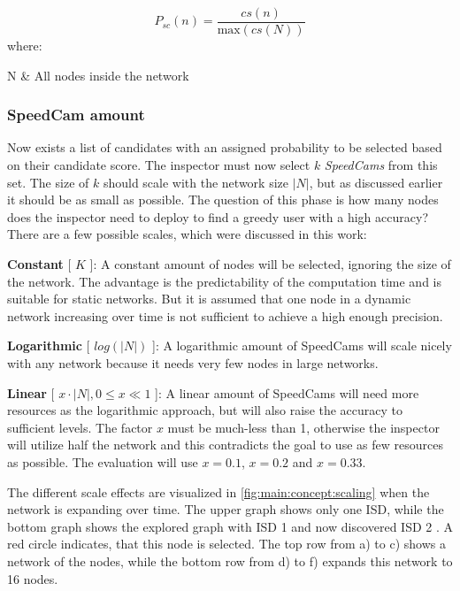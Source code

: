 \documentclass[thesis.tex]{subfiles}
\begin{document}
\begin{equation}
P_{sc}(n) = \frac{cs(n)}{\text{max}(cs(N))}
\end{equation}
where:
\begin{conditions}
    N           &  All nodes inside the network 
\end{conditions}

\subsubsection{SpeedCam amount}

Now exists a list of candidates with an assigned probability to be selected based on their candidate score. The inspector must now select $k$ \textit{SpeedCams} from this set. The size of $k$ should scale with the network size $|N|$, but as discussed earlier it should be as small as possible. The question of this phase is how many nodes does the inspector need to deploy to find a greedy user with a high accuracy? There are a few possible scales, which were discussed in this work:

\textbf{Constant} [ $K$ ]: A constant amount of nodes will be selected, ignoring the size of the network. The advantage is the predictability of the computation time and is suitable for static networks. But it is assumed that one node in a dynamic network increasing over time is not sufficient to achieve a high enough precision.

\textbf{Logarithmic} [ $log(|N|)$ ]: A logarithmic amount of SpeedCams will scale nicely with any network because it needs very few nodes in large networks. 

\textbf{Linear} [ $x\cdot |N|, 0 \leq x\ll1$ ]: A linear amount of SpeedCams will need more resources as the logarithmic approach, but will also raise the accuracy to sufficient levels. The factor $x$ must be much-less than 1, otherwise the inspector will utilize half the network and this contradicts the goal to use as few resources as possible. The evaluation will use $x=0.1$, $x=0.2$ and $x=0.33$.

The different scale effects are visualized in \autoref{fig:main:concept:scaling} when the network is expanding over time. The upper graph shows only one ISD, while the bottom graph shows the explored graph with ISD 1 and now discovered ISD 2 . A red circle indicates, that this node is selected. The top row from a) to c) shows a network of the nodes, while the bottom row from d) to f) expands this network to 16 nodes. 
\end{document}
